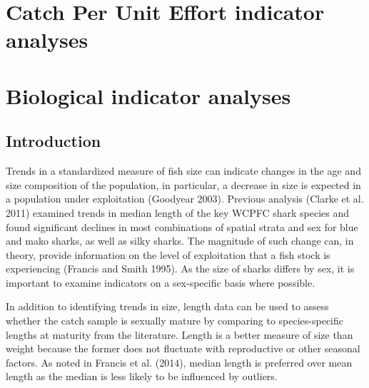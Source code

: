 \documentclass[12pt]{SCreport}
\begin{document}
\section{Catch Per Unit Effort indicator analyses}




\clearpage
      
\section{Biological indicator analyses}
      \subsection{Introduction}
Trends in a standardized measure of fish size can indicate changes in the age and size composition of the population, in particular, a decrease in size is expected in a population under exploitation (Goodyear 2003).  Previous analysis (Clarke et al. 2011) examined trends in median length of the key WCPFC shark species and found significant declines in most combinations of spatial strata and sex for blue and mako sharks, as well as silky sharks.  The magnitude of such change can, in theory, provide information on the level of exploitation that a fish stock is experiencing (Francis and Smith 1995). As the size of sharks differs by sex, it is important to examine indicators on a sex-specific basis where possible. 

In addition to identifying trends in size, length data can be used to assess whether the catch sample is sexually mature by comparing to species-specific lengths at maturity from the literature.  Length is a better measure of size than weight because the former does not fluctuate with reproductive or other seasonal factors. As noted in Francis et al. (2014), median length is preferred over mean length as the median is less likely to be influenced by outliers. 
\end{document}

